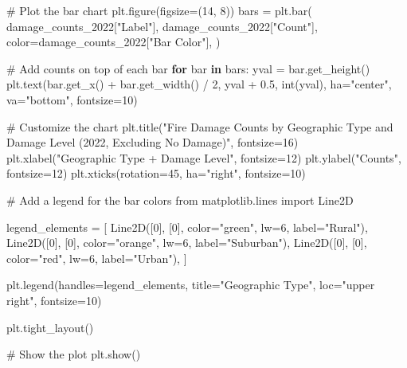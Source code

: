 \documentclass[
  letterpaper,
  DIV=11,
  numbers=noendperiod]{scrartcl}
\newenvironment{Shaded}{\begin{snugshade}}{\end{snugshade}}
\newcommand{\BuiltInTok}[1]{\textcolor[rgb]{0.00,0.23,0.31}{#1}}
\newcommand{\CommentTok}[1]{\textcolor[rgb]{0.37,0.37,0.37}{#1}}
\newcommand{\ControlFlowTok}[1]{\textcolor[rgb]{0.00,0.23,0.31}{\textbf{#1}}}
\newcommand{\DecValTok}[1]{\textcolor[rgb]{0.68,0.00,0.00}{#1}}
\newcommand{\FloatTok}[1]{\textcolor[rgb]{0.68,0.00,0.00}{#1}}
\newcommand{\ImportTok}[1]{\textcolor[rgb]{0.00,0.46,0.62}{#1}}
\newcommand{\KeywordTok}[1]{\textcolor[rgb]{0.00,0.23,0.31}{\textbf{#1}}}
\newcommand{\NormalTok}[1]{\textcolor[rgb]{0.00,0.23,0.31}{#1}}
\newcommand{\OperatorTok}[1]{\textcolor[rgb]{0.37,0.37,0.37}{#1}}
\newcommand{\StringTok}[1]{\textcolor[rgb]{0.13,0.47,0.30}{#1}}
\begin{document}
\begin{Shaded}
\begin{Highlighting}[]
\CommentTok{\# Plot the bar chart}
\NormalTok{plt.figure(figsize}\OperatorTok{=}\NormalTok{(}\DecValTok{14}\NormalTok{, }\DecValTok{8}\NormalTok{))}
\NormalTok{bars }\OperatorTok{=}\NormalTok{ plt.bar(}
\NormalTok{    damage\_counts\_2022[}\StringTok{"Label"}\NormalTok{],}
\NormalTok{    damage\_counts\_2022[}\StringTok{"Count"}\NormalTok{],}
\NormalTok{    color}\OperatorTok{=}\NormalTok{damage\_counts\_2022[}\StringTok{"Bar Color"}\NormalTok{],}
\NormalTok{)}

\CommentTok{\# Add counts on top of each bar}
\ControlFlowTok{for}\NormalTok{ bar }\KeywordTok{in}\NormalTok{ bars:}
\NormalTok{    yval }\OperatorTok{=}\NormalTok{ bar.get\_height()}
\NormalTok{    plt.text(bar.get\_x() }\OperatorTok{+}\NormalTok{ bar.get\_width() }\OperatorTok{/} \DecValTok{2}\NormalTok{, yval }\OperatorTok{+} \FloatTok{0.5}\NormalTok{, }\BuiltInTok{int}\NormalTok{(yval), ha}\OperatorTok{=}\StringTok{"center"}\NormalTok{, va}\OperatorTok{=}\StringTok{"bottom"}\NormalTok{, fontsize}\OperatorTok{=}\DecValTok{10}\NormalTok{)}

\CommentTok{\# Customize the chart}
\NormalTok{plt.title(}\StringTok{"Fire Damage Counts by Geographic Type and Damage Level (2022, Excluding No Damage)"}\NormalTok{, fontsize}\OperatorTok{=}\DecValTok{16}\NormalTok{)}
\NormalTok{plt.xlabel(}\StringTok{"Geographic Type + Damage Level"}\NormalTok{, fontsize}\OperatorTok{=}\DecValTok{12}\NormalTok{)}
\NormalTok{plt.ylabel(}\StringTok{"Counts"}\NormalTok{, fontsize}\OperatorTok{=}\DecValTok{12}\NormalTok{)}
\NormalTok{plt.xticks(rotation}\OperatorTok{=}\DecValTok{45}\NormalTok{, ha}\OperatorTok{=}\StringTok{"right"}\NormalTok{, fontsize}\OperatorTok{=}\DecValTok{10}\NormalTok{)}

\CommentTok{\# Add a legend for the bar colors}
\ImportTok{from}\NormalTok{ matplotlib.lines }\ImportTok{import}\NormalTok{ Line2D}

\NormalTok{legend\_elements }\OperatorTok{=}\NormalTok{ [}
\NormalTok{    Line2D([}\DecValTok{0}\NormalTok{], [}\DecValTok{0}\NormalTok{], color}\OperatorTok{=}\StringTok{"green"}\NormalTok{, lw}\OperatorTok{=}\DecValTok{6}\NormalTok{, label}\OperatorTok{=}\StringTok{"Rural"}\NormalTok{),}
\NormalTok{    Line2D([}\DecValTok{0}\NormalTok{], [}\DecValTok{0}\NormalTok{], color}\OperatorTok{=}\StringTok{"orange"}\NormalTok{, lw}\OperatorTok{=}\DecValTok{6}\NormalTok{, label}\OperatorTok{=}\StringTok{"Suburban"}\NormalTok{),}
\NormalTok{    Line2D([}\DecValTok{0}\NormalTok{], [}\DecValTok{0}\NormalTok{], color}\OperatorTok{=}\StringTok{"red"}\NormalTok{, lw}\OperatorTok{=}\DecValTok{6}\NormalTok{, label}\OperatorTok{=}\StringTok{"Urban"}\NormalTok{),}
\NormalTok{]}

\NormalTok{plt.legend(handles}\OperatorTok{=}\NormalTok{legend\_elements, title}\OperatorTok{=}\StringTok{"Geographic Type"}\NormalTok{, loc}\OperatorTok{=}\StringTok{"upper right"}\NormalTok{, fontsize}\OperatorTok{=}\DecValTok{10}\NormalTok{)}

\NormalTok{plt.tight\_layout()}

\CommentTok{\# Show the plot}
\NormalTok{plt.show()}
\end{Highlighting}
\end{Shaded}
\end{document}
